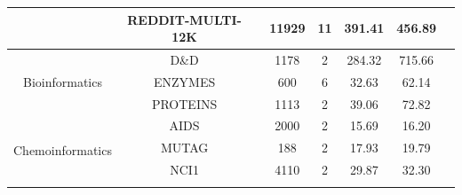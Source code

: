 \begin{table}[]
\begin{center}
{\begin{tabular}{lclccccl}
\multicolumn{1}{|l|}{}                                  & \multicolumn{1}{c|}{REDDIT-MULTI-12K} & \multicolumn{1}{c|}{}         & \multicolumn{1}{c|}{11929}          & \multicolumn{1}{c|}{11}              & \multicolumn{1}{c|}{391.41}               & \multicolumn{1}{c|}{456.89}               & \multicolumn{1}{c|}{}                            \\ \hline
\multicolumn{1}{|c|}{\multirow{3}{*}{Bioinformatics}}   & \multicolumn{1}{c|}{D\&D}             & \multicolumn{1}{c|}{} & \multicolumn{1}{c|}{1178}           & \multicolumn{1}{c|}{2}               & \multicolumn{1}{c|}{284.32}               & \multicolumn{1}{c|}{715.66}               & \multicolumn{1}{c|}{}                            \\ \cline{2-8} 
\multicolumn{1}{|l|}{}                                  & \multicolumn{1}{c|}{ENZYMES}          & \multicolumn{1}{c|}{}     & \multicolumn{1}{c|}{600}            & \multicolumn{1}{c|}{6}               & \multicolumn{1}{c|}{32.63}                & \multicolumn{1}{c|}{62.14}                & \multicolumn{1}{c|}{}                            \\ \cline{2-8} 
\multicolumn{1}{|l|}{}                                  & \multicolumn{1}{c|}{PROTEINS}         & \multicolumn{1}{c|}{}     & \multicolumn{1}{c|}{1113}           & \multicolumn{1}{c|}{2}               & \multicolumn{1}{c|}{39.06}                & \multicolumn{1}{c|}{72.82}                & \multicolumn{1}{c|}{}                            \\ \hline
\multicolumn{1}{|c|}{\multirow{5}{*}{Chemoinformatics}} & \multicolumn{1}{c|}{AIDS}             & \multicolumn{1}{c|}{}            & \multicolumn{1}{c|}{2000}           & \multicolumn{1}{c|}{2}               & \multicolumn{1}{c|}{15.69}                & \multicolumn{1}{c|}{16.20}                & \multicolumn{1}{c|}{}                            \\ \cline{2-8} 
\multicolumn{1}{|c|}{}                                  & \multicolumn{1}{c|}{MUTAG}            & \multicolumn{1}{c|}{}     & \multicolumn{1}{c|}{188}            & \multicolumn{1}{c|}{2}               & \multicolumn{1}{c|}{17.93}                & \multicolumn{1}{c|}{19.79}                & \multicolumn{1}{c|}{}                            \\ \cline{2-8} 
\multicolumn{1}{|c|}{}                                  & \multicolumn{1}{c|}{NCI1}             & \multicolumn{1}{c|}{}       & \multicolumn{1}{c|}{4110}           & \multicolumn{1}{c|}{2}               & \multicolumn{1}{c|}{29.87}                & \multicolumn{1}{c|}{32.30}                & \multicolumn{1}{c|}{}                            \\ \cline{2-8} 

\end{tabular}}
\end{center}
\end{table}
